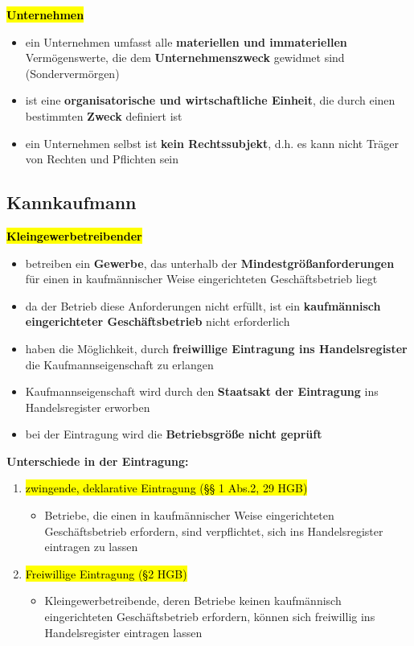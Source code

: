 \documentclass[a4paper, 10pt]{article}
\begin{document}
\noindent\textbf{\hl{Unternehmen}}
\begin{itemize}
    \item ein Unternehmen umfasst alle \textbf{materiellen und immateriellen} Vermögenswerte, die dem \textbf{Unternehmenszweck} gewidmet sind (Sondervermörgen)
    \item ist eine \textbf{organisatorische und wirtschaftliche Einheit}, die durch einen bestimmten \textbf{Zweck} definiert ist 
    \item ein Unternehmen selbst ist \textbf{kein Rechtssubjekt}, d.h. es kann nicht Träger von Rechten und Pflichten sein
\end{itemize}

\subsection{Kannkaufmann}
\textbf{\hl{Kleingewerbetreibender}}
\begin{itemize}
    \item betreiben ein \textbf{Gewerbe}, das unterhalb der \textbf{Mindestgrößanforderungen} für einen in kaufmännischer Weise eingerichteten Geschäftsbetrieb liegt
    \item da der Betrieb diese Anforderungen nicht erfüllt, ist ein \textbf{kaufmännisch eingerichteter Geschäftsbetrieb} nicht erforderlich
    \item haben die Möglichkeit, durch \textbf{freiwillige Eintragung ins Handelsregister} die Kaufmannseigenschaft zu erlangen
    \item Kaufmannseigenschaft wird durch den \textbf{Staatsakt der Eintragung} ins Handelsregister erworben 
    \item bei der Eintragung wird die \textbf{Betriebsgröße nicht geprüft}
\end{itemize}

\textbf{Unterschiede in der Eintragung:}
\begin{enumerate}
    \item \hl{zwingende, deklarative Eintragung (§§ 1 Abs.2, 29 HGB)}
    \begin{itemize}
        \item Betriebe, die einen in kaufmännischer Weise eingerichteten Geschäftsbetrieb erfordern, sind verpflichtet, sich ins Handelsregister eintragen zu lassen
    \end{itemize}

    \item \hl{Freiwillige Eintragung (§2 HGB)}
    \begin{itemize}
        \item Kleingewerbetreibende, deren Betriebe keinen kaufmännisch eingerichteten Geschäftsbetrieb erfordern, können sich freiwillig ins Handelsregister eintragen lassen
    \end{itemize}
\end{enumerate}
\end{document}

